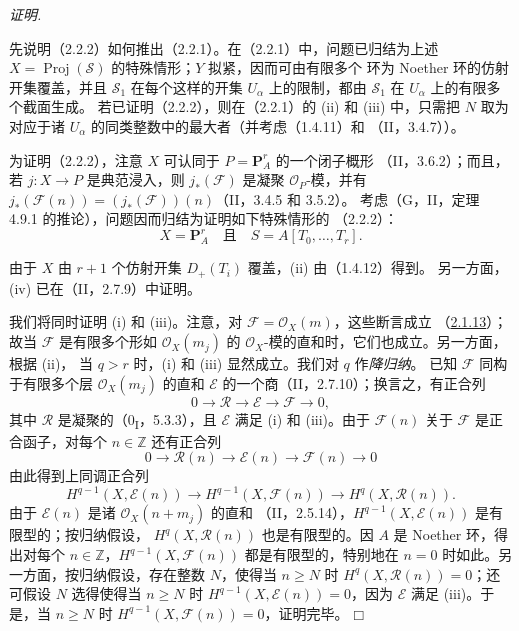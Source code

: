 \documentclass[UTF8,fontset=none,11pt,oneside,openany]{ctexbook}
\providecommand{\square}{\mdlgwhtsquare}
\newenvironment{proof}{%
  \par\smallskip\noindent\textit{证明.}\ %
}{\hfill$\square$\par}
\newcommand{\oldpage}[2][]{%
  \hypertarget{ega-source-page-#1-#2}{}%
  \marginnote{\scriptsize\textbf{#1}~|~#2}\ignorespaces}
\begin{document}
\begin{proof}
先说明（2.2.2）如何推出（2.2.1）。在（2.2.1）中，问题已归结为上述
$X=\operatorname{Proj}(\mathcal S)$ 的特殊情形；$Y$ 拟紧，因而可由有限多个
环为 Noether 环的仿射开集覆盖，并且 $\mathcal S_1$ 在每个这样的开集
$U_\alpha$ 上的限制，都由 $\mathcal S_1$ 在 $U_\alpha$ 上的有限多个截面生成。
若已证明（2.2.2），则在（2.2.1）的 (ii) 和 (iii) 中，只需把 $N$
取为对应于诸 $U_\alpha$ 的同类整数中的最大者（并考虑（1.4.11）和
（II，3.4.7））。

为证明（2.2.2），注意 $X$ 可认同于 $P=\mathbf P_A^r$ 的一个闭子概形
（II，3.6.2）；而且，若 $j:X\to P$ 是典范浸入，则
$j_*(\mathcal F)$ 是凝聚 $\mathcal O_P$-模，并有
$j_*(\mathcal F(n))=(j_*(\mathcal F))(n)$（II，3.4.5 和 3.5.2）。
考虑（G，II，定理 4.9.1 的推论），问题因而归结为证明如下特殊情形的
（2.2.2）：
\[
X=\mathbf P_A^r\quad\text{且}\quad S=A[T_0,\ldots,T_r].
\]

\oldpage[III]{101}
由于 $X$ 由 $r+1$ 个仿射开集 $D_+(T_i)$ 覆盖，(ii) 由（1.4.12）得到。
另一方面，(iv) 已在（II，2.7.9）中证明。

我们将同时证明 (i) 和 (iii)。注意，对
$\mathcal F=\mathcal O_X(m)$，这些断言成立
（\hyperref[III.2.1.13-fr]{2.1.13}）；故当 $\mathcal F$ 是有限多个形如
$\mathcal O_X(m_j)$ 的 $\mathcal O_X$-模的直和时，它们也成立。另一方面，根据 (ii)，
当 $q>r$ 时，(i) 和 (iii) 显然成立。我们对 $q$ 作\emph{降归纳}。
已知 $\mathcal F$ 同构于有限多个层 $\mathcal O_X(m_j)$ 的直和
$\mathcal E$ 的一个商（II，2.7.10）；换言之，有正合列
\[
0\longrightarrow\mathcal R\longrightarrow\mathcal E
\longrightarrow\mathcal F\longrightarrow0,
\]
其中 $\mathcal R$ 是凝聚的（0\textsubscript{I}，5.3.3），且
$\mathcal E$ 满足 (i) 和 (iii)。由于 $\mathcal F(n)$ 关于 $\mathcal F$
是正合函子，对每个 $n\in\mathbb Z$ 还有正合列
\[
0\longrightarrow\mathcal R(n)\longrightarrow\mathcal E(n)
\longrightarrow\mathcal F(n)\longrightarrow0
\]
由此得到上同调正合列
\[
H^{q-1}(X,\mathcal E(n))\longrightarrow
H^{q-1}(X,\mathcal F(n))\longrightarrow
H^q(X,\mathcal R(n)).
\]
由于 $\mathcal E(n)$ 是诸 $\mathcal O_X(n+m_j)$ 的直和
（II，2.5.14），$H^{q-1}(X,\mathcal E(n))$ 是有限型的；按归纳假设，
$H^q(X,\mathcal R(n))$ 也是有限型的。因 $A$ 是 Noether 环，得出对每个
$n\in\mathbb Z$，$H^{q-1}(X,\mathcal F(n))$ 都是有限型的，特别地在
$n=0$ 时如此。另一方面，按归纳假设，存在整数 $N$，使得当
$n\geq N$ 时 $H^q(X,\mathcal R(n))=0$；还可假设 $N$ 选得使得当
$n\geq N$ 时 $H^{q-1}(X,\mathcal E(n))=0$，因为 $\mathcal E$ 满足
(iii)。于是，当 $n\geq N$ 时
$H^{q-1}(X,\mathcal F(n))=0$，证明完毕。
\end{proof}
\end{document}
